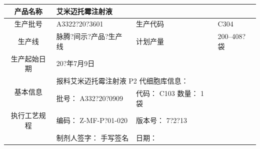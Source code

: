 \documentclass[UTF8,10pt,a4paper,fontset=fandol]{ctexart}
\newcommand{\fieldvalue}[1]{#1}
\newcommand{\handwritten}[1]{#1}
\begin{document}
\begin{tabularx}{\textwidth}{|p{2.2cm}|p{2.7cm}|X|p{2.7cm}|X|}
\hline
\multicolumn{2}{|c|}{产品名称} &
\fieldvalue{艾米迈托霉注射液} &
\multicolumn{1}{c|}{} & \\
\hline
\multicolumn{2}{|c|}{生产批号} &
\fieldvalue{\handwritten{A3322?20?3601}} &
生产代码 &
\fieldvalue{\handwritten{C304}} \\
\hline
\multicolumn{2}{|c|}{生产线} &
\fieldvalue{\handwritten{脉腾?间示?产品?生产线}} &
计划产量 &
\fieldvalue{\handwritten{200--408?袋}} \\
\hline
\multicolumn{2}{|c|}{生产起始日期} &
\fieldvalue{\handwritten{20?年7月9日}} &
\multicolumn{2}{c|}{} \\
\hline
\multicolumn{2}{|c|}{\multirow{2}{*}{基本信息}} &
\multicolumn{3}{l|}{报料艾米迈托霉注射液 P2 代细胞库信息：} \\
\cline{3-5}
\multicolumn{2}{|c|}{} &
批号：
\fieldvalue{\handwritten{A332?20?0909}}
&
代码：
\fieldvalue{\handwritten{C103}}
\quad
数量：
\fieldvalue{\handwritten{1袋}} \\
\hline
\multicolumn{2}{|c|}{执行工艺规程} &
编码：
\fieldvalue{\handwritten{Z-MF-P?01-020}}
&
版本号：
\fieldvalue{\handwritten{7?2?13}}
& \\
\cline{3-5}
\multicolumn{2}{|c|}{} &
制剂人签字：
\fieldvalue{\handwritten{手写签名}}
&
日期：

\end{tabularx}
\end{document}
